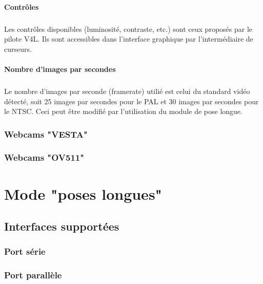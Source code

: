 \documentclass[11pt,a4paper]{book}
\begin{document}
\subsubsection{Contr\^oles}

\paragraph*{}
Les contr\^oles disponibles (luminosit\'e, contraste, etc.) sont ceux propos\'es par le pilote
V4L. Ils sont accessibles dans l'interface graphique par l'interm\'ediaire de curseurs.

\subsubsection{Nombre d'images par secondes}

\paragraph*{}
Le nombre d'images par seconde (framerate) utili\'e est celui du standard vid\'eo d\'etect\'e,
soit 25 images par secondes pour le PAL et 30 images par secondes pour le NTSC. Ceci peut \^etre
modifi\'e par l'utilisation du module de pose longue.  

\subsection{Webcams "VESTA"}

\subsection{Webcams "OV511"}

\chapter{Mode "poses longues"}

\section{Interfaces support\'ees}

\subsection{Port s\'erie}

\subsection{Port parall\`ele}
\end{document}

